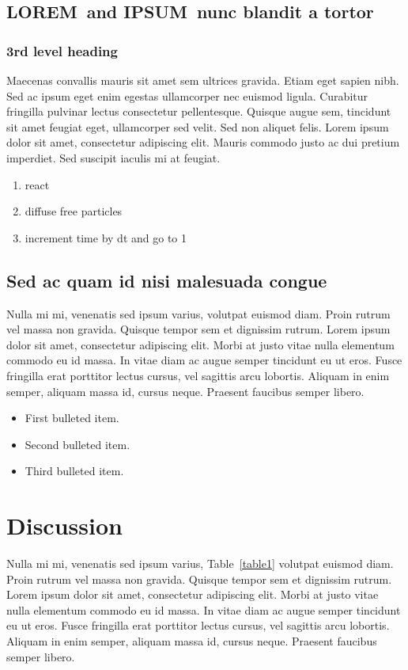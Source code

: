 \documentclass[10pt,letterpaper]{article}
\newcommand{\lorem}{{\bf LOREM}}
\newcommand{\ipsum}{{\bf IPSUM}}
\begin{document}
\subsection*{\lorem\ and \ipsum\ nunc blandit a tortor}
\subsubsection*{3rd level heading} 
Maecenas convallis mauris sit amet sem ultrices gravida. Etiam eget sapien nibh. Sed ac ipsum eget enim egestas ullamcorper nec euismod ligula. Curabitur fringilla pulvinar lectus consectetur pellentesque. Quisque augue sem, tincidunt sit amet feugiat eget, ullamcorper sed velit. Sed non aliquet felis. Lorem ipsum dolor sit amet, consectetur adipiscing elit. Mauris commodo justo ac dui pretium imperdiet. Sed suscipit iaculis mi at feugiat. 

\begin{enumerate}
	\item{react}
	\item{diffuse free particles}
	\item{increment time by dt and go to 1}
\end{enumerate}


\subsection*{Sed ac quam id nisi malesuada congue}

Nulla mi mi, venenatis sed ipsum varius, volutpat euismod diam. Proin rutrum vel massa non gravida. Quisque tempor sem et dignissim rutrum. Lorem ipsum dolor sit amet, consectetur adipiscing elit. Morbi at justo vitae nulla elementum commodo eu id massa. In vitae diam ac augue semper tincidunt eu ut eros. Fusce fringilla erat porttitor lectus cursus, vel sagittis arcu lobortis. Aliquam in enim semper, aliquam massa id, cursus neque. Praesent faucibus semper libero.

\begin{itemize}
	\item First bulleted item.
	\item Second bulleted item.
	\item Third bulleted item.
\end{itemize}

\section*{Discussion}
Nulla mi mi, venenatis sed ipsum varius, Table~\ref{table1} volutpat euismod diam. Proin rutrum vel massa non gravida. Quisque tempor sem et dignissim rutrum. Lorem ipsum dolor sit amet, consectetur adipiscing elit. Morbi at justo vitae nulla elementum commodo eu id massa. In vitae diam ac augue semper tincidunt eu ut eros. Fusce fringilla erat porttitor lectus cursus, vel sagittis arcu lobortis. Aliquam in enim semper, aliquam massa id, cursus neque. Praesent faucibus semper libero.
\end{document}
